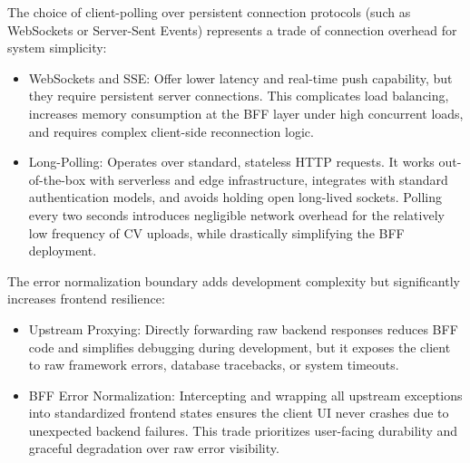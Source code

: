 \documentclass[12pt, a4paper]{report}
\begin{document}
\vspace{0.6cm}
\vspace{0.4cm}

\vspace{0.3cm}

The choice of client-polling over persistent connection protocols (such as WebSockets or Server-Sent Events) represents a trade of connection overhead for system simplicity:
\begin{itemize}
    \item WebSockets and SSE: Offer lower latency and real-time push capability, but they require persistent server connections. This complicates load balancing, increases memory consumption at the BFF layer under high concurrent loads, and requires complex client-side reconnection logic.
    \item Long-Polling: Operates over standard, stateless HTTP requests. It works out-of-the-box with serverless and edge infrastructure, integrates with standard authentication models, and avoids holding open long-lived sockets. Polling every two seconds introduces negligible network overhead for the relatively low frequency of CV uploads, while drastically simplifying the BFF deployment.
\end{itemize}

\vspace{0.3cm}

The error normalization boundary adds development complexity but significantly increases frontend resilience:
\begin{itemize}
    \item Upstream Proxying: Directly forwarding raw backend responses reduces BFF code and simplifies debugging during development, but it exposes the client to raw framework errors, database tracebacks, or system timeouts.
    \item BFF Error Normalization: Intercepting and wrapping all upstream exceptions into standardized frontend states ensures the client UI never crashes due to unexpected backend failures. This trade prioritizes user-facing durability and graceful degradation over raw error visibility.
\end{itemize}
\end{document}
